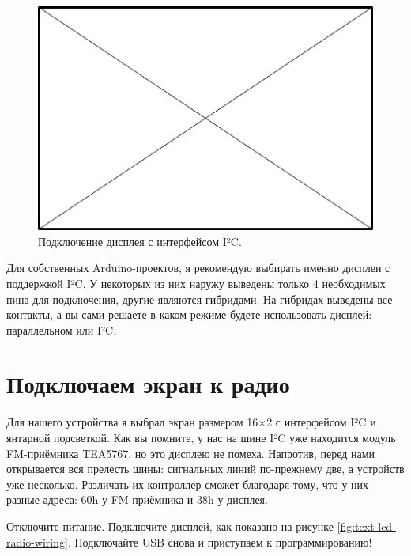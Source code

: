 \begin{figure}
  \centering
  \includegraphics{TODO}
  \caption{Подключение дисплея с интерфейсом I²C.}
  \label{fig:text-lcd-i2c}
\end{figure}

Для собственных Arduino-проектов, я рекомендую выбирать именно дисплеи с поддержкой I²C. У некоторых из них наружу выведены только 4 необходимых пина для подключения, другие являются гибридами. На гибридах выведены все контакты, а вы сами решаете в каком режиме будете использовать дисплей: параллельном или I²C.

\section{Подключаем экран к радио}

Для нашего устройства я выбрал экран размером 16×2 с интерфейсом I²C и янтарной подсветкой. Как вы помните, у нас на шине I²C уже находится модуль FM-приёмника TEA5767, но это дисплею не помеха. Напротив, перед нами открывается вся прелесть шины: сигнальных линий по-прежнему две, а устройств уже несколько. Различать их контроллер сможет благодаря тому, что у них разные адреса: 60h у FM-приёмника и 38h у дисплея.

Отключите питание. Подключите дисплей, как показано на рисунке \ref{fig:text-lcd-radio-wiring}. Подключайте USB снова и приступаем к программированию!

